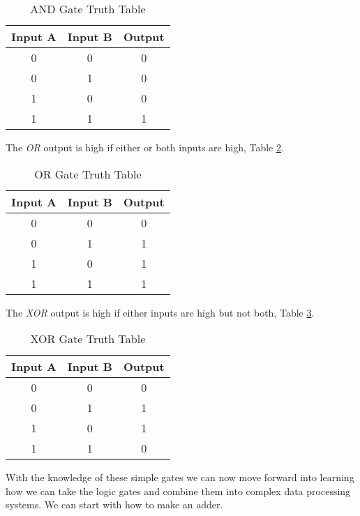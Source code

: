 \begin{table}[h!]  
\begin{center}    
\caption{AND Gate Truth Table} 
\label{tab:ttand} \begin{tabular}{|c|c|c|}  
\textbf{Input A} & \textbf{Input B} & \textbf{Output}\\  
\hline  
0 & 0 & 0\\  
0 & 1 & 0\\  
1 & 0 & 0\\  
1 & 1 & 1\\ 
\end{tabular}  
\end{center}
\end{table}

The \emph{OR} output is high if either or both inputs are high, Table \ref{tab:ttor}.

\begin{table}[h!]  
\begin{center}    
\caption{OR Gate Truth Table} 
\label{tab:ttor} 
\begin{tabular}{|c|c|c|}  
\textbf{Input A} & \textbf{Input B} & \textbf{Output}\\  
\hline  
0 & 0 & 0\\  
0 & 1 & 1\\  
1 & 0 & 1\\  
1 & 1 & 1\\ 
\end{tabular}  
\end{center}
\end{table}

The \emph{XOR} output is high if either inputs are high but not both, Table \ref{tab:ttxor}.

\begin{table}[h!]  
\begin{center}    
\caption{XOR Gate Truth Table} 
\label{tab:ttxor} 
\begin{tabular}{|c|c|c|}  
\textbf{Input A} & \textbf{Input B} & \textbf{Output}\\  
\hline  
0 & 0 & 0\\  
0 & 1 & 1\\  
1 & 0 & 1\\  
1 & 1 & 0\\ 
\end{tabular}  
\end{center}
\end{table}

With the knowledge of these simple gates we can now move forward into learning how we can take the logic gates and combine them into complex data processing systems. We can start with how to make an adder.



